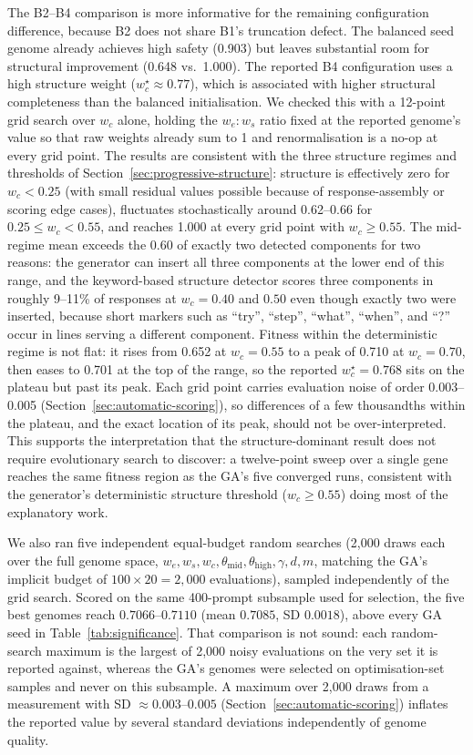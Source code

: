 \documentclass[mathematics,article,submit,xetex,moreauthors]{Definitions/mdpi}
\begin{document}
The B2--B4 comparison is more informative for the remaining configuration
difference, because B2 does not share B1's truncation defect. The balanced
seed genome already achieves high safety (0.903) but leaves substantial room
for structural improvement (0.648 vs.\ 1.000). The reported B4 configuration
uses a high structure weight ($w_c^{\star} \approx 0.77$), which is
associated with higher structural completeness than the balanced
initialisation. We checked this with a 12-point grid search over $w_c$ alone,
holding the $w_e{:}w_s$ ratio fixed at the reported genome's value so that
raw weights already sum to 1 and renormalisation is a no-op at every grid
point. The results are consistent with the three structure regimes and
thresholds of Section~\ref{sec:progressive-structure}: structure is
effectively zero for $w_c < 0.25$ (with small residual values possible
because of response-assembly or scoring edge cases), fluctuates
stochastically around 0.62--0.66 for $0.25 \le w_c < 0.55$, and reaches 1.000
at every grid point with $w_c \ge 0.55$. 
The mid-regime mean exceeds the 0.60 of exactly two detected components for two reasons: the generator can insert
all three components at the lower end of this range, and the keyword-based
structure detector scores three components in roughly 9--11\% of responses at
$w_c=0.40$ and $0.50$ even though exactly two were inserted, because short
markers such as ``try'', ``step'', ``what'', ``when'', and ``?'' occur in
lines serving a different component. Fitness within the deterministic regime
is not flat: it rises from 0.652 at $w_c = 0.55$ to a peak of 0.710 at
$w_c = 0.70$, then eases to 0.701 at the top of the range, so the reported
$w_c^{\star} = 0.768$ sits on the plateau but past its peak. Each grid point
carries evaluation noise of order 0.003--0.005 (Section~\ref{sec:automatic-scoring}),
so differences of a few thousandths within the plateau, and the exact
location of its peak, should not be over-interpreted. This supports the
interpretation that the structure-dominant result does not require
evolutionary search to discover: a twelve-point sweep over a single gene
reaches the same fitness region as the GA's five converged runs, consistent
with the generator's deterministic structure threshold ($w_c \ge 0.55$) doing
most of the explanatory work.

We also ran five independent equal-budget random searches (2,000 draws each
over the full genome space, $w_e, w_s, w_c, \theta_\mathrm{mid},
\theta_\mathrm{high}, \gamma, d, m$, matching the GA's implicit budget of
$100 \times 20 = 2{,}000$ evaluations), sampled independently of the grid
search. Scored on the same 400-prompt subsample used for selection, the five
best genomes reach $0.7066$--$0.7110$ (mean $0.7085$, SD $0.0018$), above
every GA seed in Table~\ref{tab:significance}. That comparison is not sound:
each random-search maximum is the largest of 2,000 noisy evaluations on the
very set it is reported against, whereas the GA's genomes were selected on
optimisation-set samples and never on this subsample. A maximum over 2,000
draws from a measurement with SD $\approx 0.003$--$0.005$
(Section~\ref{sec:automatic-scoring}) inflates the reported value by several
standard deviations independently of genome quality.
\end{document}
